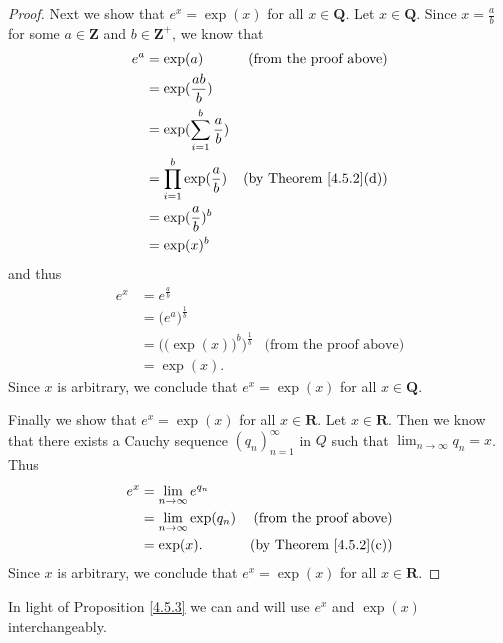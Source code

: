\begin{proof}
    Next we show that \(e^x = \exp(x)\) for all \(x \in \mathbf{Q}\).
    Let \(x \in \mathbf{Q}\).
    Since \(x = \frac{a}{b}\) for some \(a \in \mathbf{Z}\) and \(b \in \mathbf{Z}^+\), we know that
    \begin{align*}
        e^a & = \exp(a)                           & \text{(from the proof above)}      \\
            & = \exp(\frac{ab}{b})                                                     \\
            & = \exp(\sum_{i = 1}^b \frac{a}{b})                                       \\
            & = \prod_{i = 1}^b \exp(\frac{a}{b}) & \text{(by Theorem \ref{4.5.2}(d))} \\
            & = \exp(\frac{a}{b})^b                                                    \\
            & = \exp(x)^b
    \end{align*}
    and thus
    \begin{align*}
        e^x & = e^{\frac{a}{b}}                                                             \\
            & = \big(e^a\big)^{\frac{1}{b}}                                                 \\
            & = \Big(\big(\exp(x)\big)^b\Big)^{\frac{1}{b}} & \text{(from the proof above)} \\
            & = \exp(x).
    \end{align*}
    Since \(x\) is arbitrary, we conclude that \(e^x = \exp(x)\) for all \(x \in \mathbf{Q}\).

    Finally we show that \(e^x = \exp(x)\) for all \(x \in \mathbf{R}\).
    Let \(x \in \mathbf{R}\).
    Then we know that there exists a Cauchy sequence \((q_n)_{n = 1}^\infty\) in \(Q\) such that \(\lim_{n \to \infty} q_n = x\).
    Thus
    \begin{align*}
        e^x & = \lim_{n \to \infty} e^{q_n}                                        \\
            & = \lim_{n \to \infty} \exp(q_n) & \text{(from the proof above)}      \\
            & = \exp(x).                      & \text{(by Theorem \ref{4.5.2}(c))}
    \end{align*}
    Since \(x\) is arbitrary, we conclude that \(e^x = \exp(x)\) for all \(x \in \mathbf{R}\).
\end{proof}

\begin{note}
    In light of Proposition \ref{4.5.3} we can and will use \(e^x\) and \(\exp(x)\) interchangeably.
\end{note}

